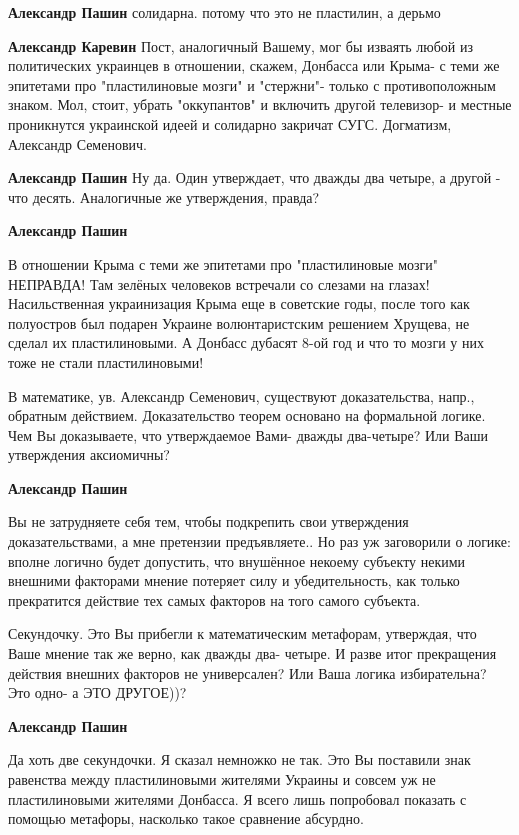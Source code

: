 \begin{itemize}
\begin{itemize}
\textbf{Александр Пашин} солидарна. потому что это не пластилин, а дерьмо

\textbf{Александр Каревин} Пост, аналогичный Вашему, мог бы изваять любой из политических украинцев в отношении, скажем, Донбасса или Крыма- с теми же эпитетами про "пластилиновые мозги" и "стержни"- только с противоположным знаком. Мол, стоит, убрать "оккупантов" и включить другой телевизор- и местные проникнутся украинской идеей и солидарно закричат СУГС. Догматизм, Александр Семенович.

\textbf{Александр Пашин} Ну да. Один утверждает, что дважды два четыре, а другой - что десять. Аналогичные же утверждения, правда?

\textbf{Александр Пашин} 

В отношении Крыма с теми же эпитетами про "пластилиновые мозги" НЕПРАВДА! Там
зелёных человеков встречали со слезами на глазах! Насильственная украинизация
Крыма еще в советские годы, после того как полуостров был подарен Украине
волюнтаристским решением Хрущева, не сделал их пластилиновыми. А Донбасс
дубасят 8-ой год и что то мозги у них тоже не стали пластилиновыми!


В математике, ув. Александр Семенович, существуют доказательства, напр.,
обратным действием. Доказательство теорем основано на формальной логике. Чем Вы
доказываете, что утверждаемое Вами- дважды два-четыре? Или Ваши утверждения
аксиомичны?

\textbf{Александр Пашин} 

Вы не затрудняете себя тем, чтобы подкрепить свои утверждения доказательствами,
а мне претензии предъявляете.. Но раз уж заговорили о логике: вполне логично
будет допустить, что внушённое некоему субъекту некими внешними факторами
мнение потеряет силу и убедительность, как только прекратится действие тех
самых факторов на того самого субъекта.


Секундочку. Это Вы прибегли к математическим метафорам, утверждая, что Ваше
мнение так же верно, как дважды два- четыре. И разве итог прекращения действия
внешних факторов не универсален? Или Ваша логика избирательна? Это одно- а ЭТО
ДРУГОЕ))?

\textbf{Александр Пашин} 

Да хоть две секундочки. Я сказал немножко не так. Это Вы поставили знак
равенства между пластилиновыми жителями Украины и совсем уж не пластилиновыми
жителями Донбасса. Я всего лишь попробовал показать с помощью метафоры,
насколько такое сравнение абсурдно.


\end{itemize}
\end{itemize}
